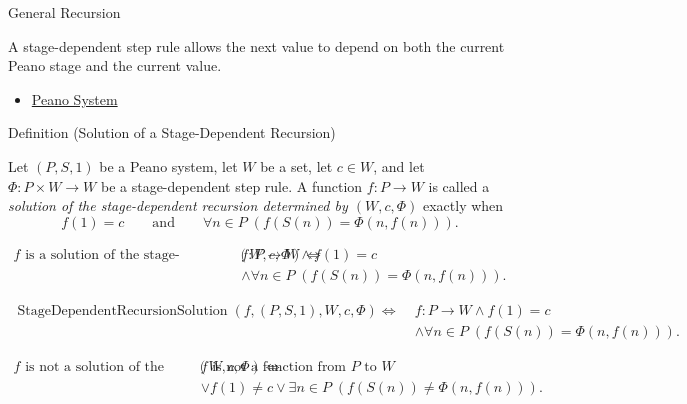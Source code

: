 \begin{topicbox}{General Recursion}
\begin{remark*}[Interpretation]
A stage-dependent step rule allows the next value to depend on both the
current Peano stage and the current value.
\end{remark*}

\begin{dependencies}
\begin{itemize}
  \item \hyperref[def:peano-system]{Peano System}
\end{itemize}
\end{dependencies}

\begin{definitionbox}{Definition (Solution of a Stage-Dependent Recursion)}
\begin{definition}
\label{def:general-recursive-function}
Let $(P,S,1)$ be a Peano system, let $W$ be a set, let $c\in W$, and let
$\Phi\colon P\times W\to W$ be a stage-dependent step rule. A function
$f\colon P\to W$
is called a \emph{solution of the stage-dependent recursion determined by
$(W,c,\Phi)$}
exactly when
\[
f(1)=c
\qquad\text{and}\qquad
\forall n\in P\;(f(S(n))=\Phi(n,f(n))).
\]
\end{definition}
\end{definitionbox}

\begin{remark*}
\[
\begin{aligned}
f \text{ is a solution of the stage-dependent recursion determined by } (W,c,\Phi)
\Longleftrightarrow\;&
f\colon P\to W\land f(1)=c\\
&\land \forall n\in P\;(f(S(n))=\Phi(n,f(n))).
\end{aligned}
\]
\end{remark*}

\begin{remark*}
\[
\begin{aligned}
\operatorname{StageDependentRecursionSolution}(f,(P,S,1),W,c,\Phi)
\Longleftrightarrow\;&
f\colon P\to W\land f(1)=c\\
&\land \forall n\in P\;(f(S(n))=\Phi(n,f(n))).
\end{aligned}
\]
\end{remark*}

\begin{remark*}
\[
\begin{aligned}
f \text{ is not a solution of the stage-dependent recursion determined by } (W,c,\Phi)
\Longleftrightarrow\;&
f \text{ is not a function from } P \text{ to } W\\
&\lor f(1)\neq c
\lor \exists n\in P\;(f(S(n))\neq \Phi(n,f(n))).
\end{aligned}
\]
\end{remark*}


\end{topicbox}
